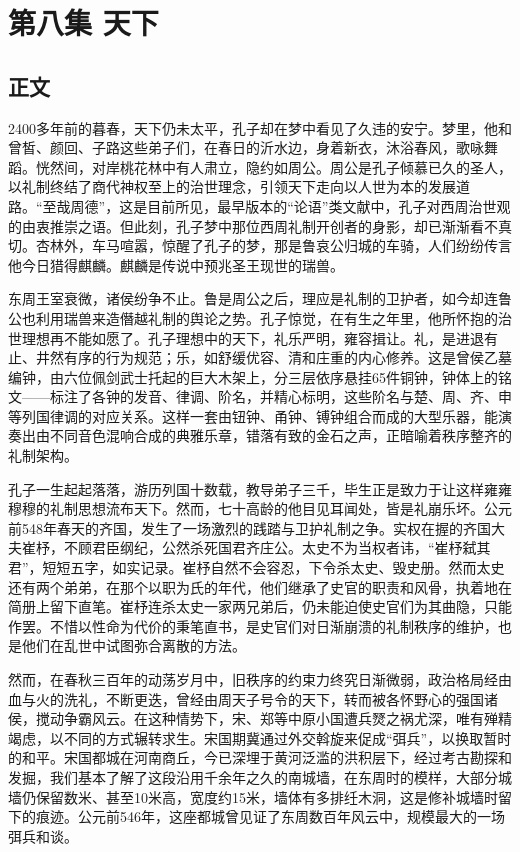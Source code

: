 \chapter{第八集 \quad 天下}

\section{正文}

2400多年前的暮春，天下仍未太平，孔子却在梦中看见了久违的安宁。梦里，他和曾皙、颜回、子路这些弟子们，在春日的沂水边，身着新衣，沐浴春风，歌咏舞蹈。恍然间，对岸桃花林中有人肃立，隐约如周公。周公是孔子倾慕已久的圣人，以礼制终结了商代神权至上的治世理念，引领天下走向以人世为本的发展道路。“至哉周德”，这是目前所见，最早版本的“论语”类文献中，孔子对西周治世观的由衷推崇之语。但此刻，孔子梦中那位西周礼制开创者的身影，却已渐渐看不真切。杏林外，车马喧嚣，惊醒了孔子的梦，那是鲁哀公归城的车骑，人们纷纷传言他今日猎得麒麟。麒麟是传说中预兆圣王现世的瑞兽。

东周王室衰微，诸侯纷争不止。鲁是周公之后，理应是礼制的卫护者，如今却连鲁公也利用瑞兽来造僭越礼制的舆论之势。孔子惊觉，在有生之年里，他所怀抱的治世理想再不能如愿了。孔子理想中的天下，礼乐严明，雍容揖让。礼，是进退有止、井然有序的行为规范；乐，如舒缓优容、清和庄重的内心修养。这是曾侯乙墓编钟，由六位佩剑武士托起的巨大木架上，分三层依序悬挂65件铜钟，钟体上的铭文——标注了各钟的发音、律调、阶名，并精心标明，这些阶名与楚、周、齐、申等列国律调的对应关系。这样一套由钮钟、甬钟、镈钟组合而成的大型乐器，能演奏出由不同音色混响合成的典雅乐章，错落有致的金石之声，正暗喻着秩序整齐的礼制架构。

孔子一生起起落落，游历列国十数载，教导弟子三千，毕生正是致力于让这样雍雍穆穆的礼制思想流布天下。然而，七十高龄的他目见耳闻处，皆是礼崩乐坏。公元前548年春天的齐国，发生了一场激烈的践踏与卫护礼制之争。实权在握的齐国大夫崔杼，不顾君臣纲纪，公然杀死国君齐庄公。太史不为当权者讳，“崔杼弑其君”，短短五字，如实记录。崔杼自然不会容忍，下令杀太史、毁史册。然而太史还有两个弟弟，在那个以职为氏的年代，他们继承了史官的职责和风骨，执着地在简册上留下直笔。崔杼连杀太史一家两兄弟后，仍未能迫使史官们为其曲隐，只能作罢。不惜以性命为代价的秉笔直书，是史官们对日渐崩溃的礼制秩序的维护，也是他们在乱世中试图弥合离散的方法。

然而，在春秋三百年的动荡岁月中，旧秩序的约束力终究日渐微弱，政治格局经由血与火的洗礼，不断更迭，曾经由周天子号令的天下，转而被各怀野心的强国诸侯，搅动争霸风云。在这种情势下，宋、郑等中原小国遭兵燹之祸尤深，唯有殚精竭虑，以不同的方式辗转求生。宋国期冀通过外交斡旋来促成“弭兵”，以换取暂时的和平。宋国都城在河南商丘，今已深埋于黄河泛滥的洪积层下，经过考古勘探和发掘，我们基本了解了这段沿用千余年之久的南城墙，在东周时的模样，大部分城墙仍保留数米、甚至10米高，宽度约15米，墙体有多排纴木洞，这是修补城墙时留下的痕迹。公元前546年，这座都城曾见证了东周数百年风云中，规模最大的一场弭兵和谈。

